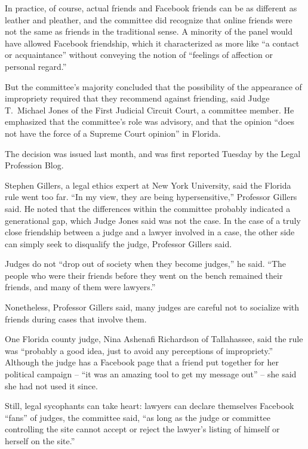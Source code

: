 ﻿\documentclass[12pt]{article}
\begin{document}
In practice, of course, actual friends and Facebook friends can be as different as leather and
pleather, and the committee did recognize that online friends were not the same as friends in the
traditional sense. A minority of the panel would have allowed Facebook friendship, which it
characterized as more like ``a contact or acquaintance'' without conveying the notion of ``feelings
of affection or personal regard.''

But the committee's majority concluded that the possibility of the appearance of impropriety
required that they recommend against friending, said Judge T.~Michael Jones of the First Judicial
Circuit Court, a committee member. He emphasized that the committee's role was advisory, and that
the opinion ``does not have the force of a Supreme Court opinion'' in Florida.

The decision was issued last month, and was first reported Tuesday by the Legal Profession Blog.

Stephen Gillers, a legal ethics expert at New York University, said the Florida rule went too far.
``In my view, they are being hypersensitive,'' Professor Gillers said. He noted that the differences
within the committee probably indicated a generational gap, which Judge Jones said was not the case.
In the case of a truly close friendship between a judge and a lawyer involved in a case, the other
side can simply seek to disqualify the judge, Professor Gillers said.

Judges do not ``drop out of society when they become judges,'' he said. ``The people who were their
friends before they went on the bench remained their friends, and many of them were lawyers.''

Nonetheless, Professor Gillers said, many judges are careful not to socialize with friends during
cases that involve them.

One Florida county judge, Nina Ashenafi Richardson of Tallahassee, said the rule was ``probably a
good idea, just to avoid any perceptions of impropriety.'' Although the judge has a Facebook page
that a friend put together for her political campaign -- ``it was an amazing tool to get my message
out'' -- she said she had not used it since.

Still, legal sycophants can take heart: lawyers can declare themselves Facebook ``fans'' of judges,
the committee said, ``as long as the judge or committee controlling the site cannot accept or reject
the lawyer's listing of himself or herself on the site.''
\end{document}
